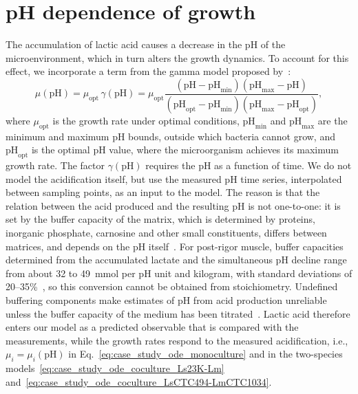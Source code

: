 \documentclass[10pt,1p,authoryear]{elsarticle}
\numberwithin{equation}{section}
\begin{document}
\section{pH dependence of growth}
\label{sec:supplement-case-study-pH-dependence}
The accumulation of lactic acid causes a decrease in the pH of the microenvironment, which in turn alters the growth dynamics.
To account for this effect, we incorporate a term from the gamma model proposed by~\citet{zwietering_decision_1992}:
\begin{equation}
    \mu(\mathrm{pH}) = \mu_\text{opt}\, \gamma(\mathrm{pH}) =  \mu_\text{opt} \frac{(\mathrm{pH} - \mathrm{pH}_\text{min})(\mathrm{pH}_\text{max} - \mathrm{pH})}{(\mathrm{pH}_\text{opt} - \mathrm{pH}_\text{min})(\mathrm{pH}_\text{max} - \mathrm{pH}_\text{opt})},
    \label{eq:case_study_mu_pH}
\end{equation}
where $\mu_\text{opt}$ is the growth rate under optimal conditions, $\mathrm{pH}_\text{min}$ and $\mathrm{pH}_\text{max}$ are the minimum and maximum pH bounds, outside which bacteria cannot grow, and $\mathrm{pH}_\text{opt}$ is the optimal pH value, where the microorganism achieves its maximum growth rate.
%
The factor $\gamma(\mathrm{pH})$ requires the pH as a function of time.
We do not model the acidification itself, but use the measured pH time series, interpolated between sampling points, as an input to the model.
The reason is that the relation between the acid produced and the resulting pH is not one-to-one: it is set by the buffer capacity of the matrix, which is determined by proteins, inorganic phosphate, carnosine and other small constituents, differs between matrices, and depends on the pH itself~\citep{puolanne2000buffering, kylapuhju2004buffering, salaun2005buffering}.
For post-rigor muscle, buffer capacities determined from the accumulated lactate and the simultaneous pH decline range from about 32 to 49~mmol per pH unit and kilogram, with standard deviations of 20--35\%~\citep{kylapuhju2004buffering}, so this conversion cannot be obtained from stoichiometry.
Undefined buffering components make estimates of pH from acid production unreliable unless the buffer capacity of the medium has been titrated~\citep{breidt2022buffer}.
Lactic acid therefore enters our model as a predicted observable that is compared with the measurements, while the growth rates respond to the measured acidification, i.e., $\mu_i = \mu_i(\mathrm{pH})$ in Eq.~\eqref{eq:case_study_ode_monoculture} and in the two-species models~\eqref{eq:case_study_ode_coculture_Ls23K-Lm} and~\eqref{eq:case_study_ode_coculture_LsCTC494-LmCTC1034}.
\end{document}
